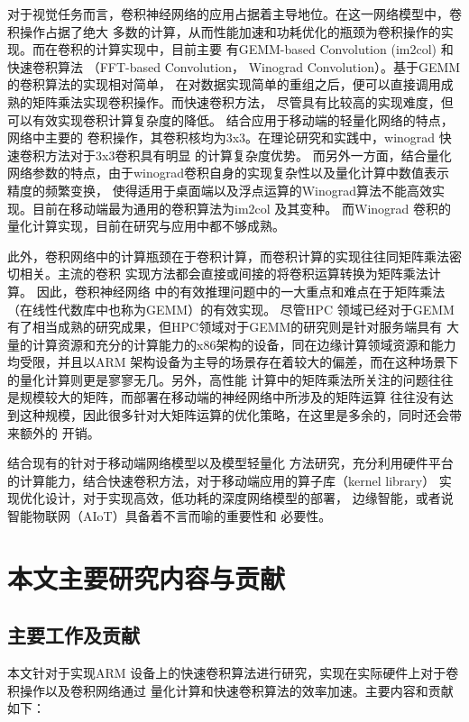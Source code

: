 对于视觉任务而言，卷积神经网络的应用占据着主导地位。在这一网络模型中，卷积操作占据了绝大
多数的计算，从而性能加速和功耗优化的瓶颈为卷积操作的实现。而在卷积的计算实现中，目前主要
有GEMM-based Convolution (im2col) 和快速卷积算法
（FFT-based Convolution， Winograd Convolution）。基于GEMM的卷积算法的实现相对简单，
在对数据实现简单的重组之后，便可以直接调用成熟的矩阵乘法实现卷积操作。而快速卷积方法，
尽管具有比较高的实现难度，但可以有效实现卷积计算复杂度的降低。
结合应用于移动端的轻量化网络的特点，网络中主要的
卷积操作，其卷积核均为3x3。在理论研究和实践中，winograd 快速卷积方法对于3x3卷积具有明显
的计算复杂度优势。
而另外一方面，结合量化网络参数的特点，由于winograd卷积自身的实现复杂性以及量化计算中数值表示精度的频繁变换，
使得适用于桌面端以及浮点运算的Winograd算法不能高效实现。目前在移动端最为通用的卷积算法为im2col 及其变种。
而Winograd 卷积的量化计算实现，目前在研究与应用中都不够成熟。

此外，卷积网络中的计算瓶颈在于卷积计算，而卷积计算的实现往往同矩阵乘法密切相关。主流的卷积
实现方法都会直接或间接的将卷积运算转换为矩阵乘法计算。 因此，卷积神经网络
中的有效推理问题中的一大重点和难点在于矩阵乘法（在线性代数库中也称为GEMM）的有效实现。
尽管HPC 领域已经对于GEMM有了相当成熟的研究成果，但HPC领域对于GEMM的研究则是针对服务端具有
大量的计算资源和充分的计算能力的x86架构的设备，同在边缘计算领域资源和能力均受限，并且以ARM
架构设备为主导的场景存在着较大的偏差，而在这种场景下的量化计算则更是寥寥无几。另外，高性能
计算中的矩阵乘法所关注的问题往往是规模较大的矩阵，而部署在移动端的神经网络中所涉及的矩阵运算
往往没有达到这种规模，因此很多针对大矩阵运算的优化策略，在这里是多余的，同时还会带来额外的
开销。

结合现有的针对于移动端网络模型以及模型轻量化
方法研究，充分利用硬件平台的计算能力，结合快速卷积方法，对于移动端应用的算子库（kernel library）
实现优化设计，对于实现高效，低功耗的深度网络模型的部署，
边缘智能，或者说智能物联网（AIoT）具备着不言而喻的重要性和
必要性。


\section{本文主要研究内容与贡献}

\subsection{主要工作及贡献}

本文针对于实现ARM 设备上的快速卷积算法进行研究，实现在实际硬件上对于卷积操作以及卷积网络通过
量化计算和快速卷积算法的效率加速。主要内容和贡献如下：

